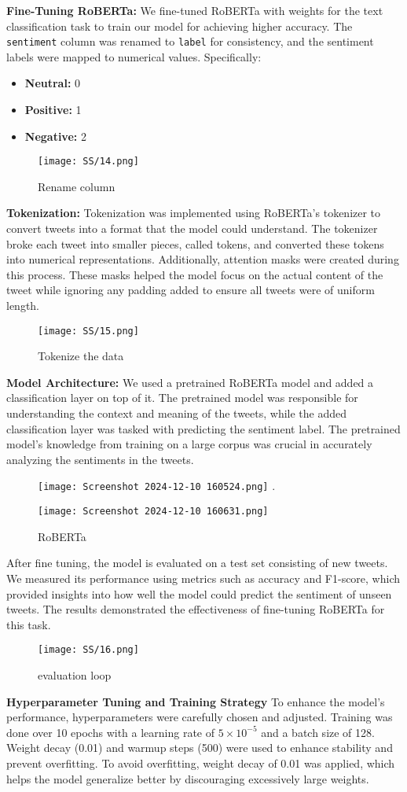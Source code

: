 \documentclass[journal]{IEEEtran}
\begin{document}
\textbf{Fine-Tuning RoBERTa:}
We fine-tuned RoBERTa with weights for the text classification task to train our model for achieving higher accuracy. The \texttt{sentiment} column was renamed to \texttt{label} for consistency, and the sentiment labels were mapped to numerical values. Specifically:
\begin{itemize}
    \item \textbf{Neutral:} 0
    \item \textbf{Positive:} 1
    \item \textbf{Negative:} 2
\end{itemize}

\begin{figure}[H]
\centering
\texttt{[image: SS/14.png]}
\caption{Rename column}
\end{figure}
\textbf{Tokenization:}
Tokenization was implemented using RoBERTa’s tokenizer to convert tweets into a format that the model could understand. The tokenizer broke each tweet into smaller pieces, called tokens, and converted these tokens into numerical representations. Additionally, attention masks were created during this process. These masks helped the model focus on the actual content of the tweet while ignoring any padding added to ensure all tweets were of uniform length.
\begin{figure}[H]
\centering
\texttt{[image: SS/15.png]}
\caption{Tokenize the data }
\end{figure}
\textbf{Model Architecture:}
We used a pretrained RoBERTa model and added a classification layer on top of it. The pretrained model was responsible for understanding the context and meaning of the tweets, while the added classification layer was tasked with predicting the sentiment label. The pretrained model's knowledge from training on a large corpus was crucial in accurately analyzing the sentiments in the tweets.
\begin{figure}[H]
\centering
\texttt{[image: Screenshot 2024-12-10 160524.png]}
.
 
\texttt{[image: Screenshot 2024-12-10 160631.png]}
\caption{RoBERTa }
\end{figure}
After fine tuning, the model is evaluated on a test set consisting of new tweets. We measured its performance using metrics such as accuracy and F1-score, which provided insights into how well the model could predict the sentiment of unseen tweets. The results demonstrated the effectiveness of fine-tuning RoBERTa for this task. 
\begin{figure}[H]
\centering
\texttt{[image: SS/16.png]}
\caption{evaluation loop }
\end{figure}
\textbf{Hyperparameter Tuning and Training Strategy}
To enhance the model's performance, hyperparameters were carefully chosen and adjusted. Training was done over 10 epochs with a learning rate of \(5 \times 10^{-5}\) and a batch size of 128. Weight decay (0.01) and warmup steps (500) were used to enhance stability and prevent overfitting. To avoid overfitting, weight decay of 0.01 was applied, which helps the model generalize better by discouraging excessively large weights. 
\end{document}
